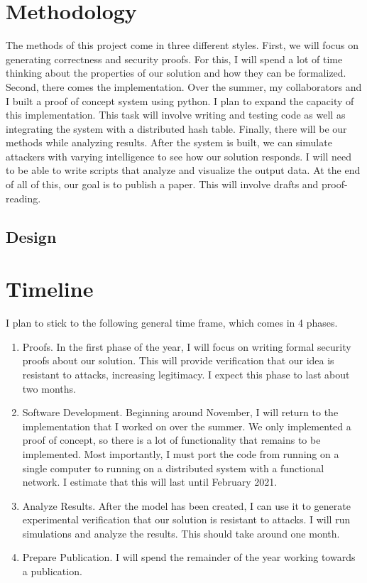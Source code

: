 \section{Methodology}
\label{sec:methodology}


The methods of this project come in three different styles.
First, we will focus on generating correctness and security proofs.
For this, I will spend a lot of time thinking about the properties of our solution and how they can be formalized.
Second, there comes the implementation.
Over the summer, my collaborators and I built a proof of concept system using python.
I plan to expand the capacity of this implementation.
This task will involve writing and testing code as well as integrating the system with a distributed hash table.
Finally, there will be our methods while analyzing results.
After the system is built, we can simulate attackers with varying intelligence to see how our solution responds.
I will need to be able to write scripts that analyze and visualize the output data.
At the end of all of this, our goal is to publish a paper.
This will involve drafts and proof-reading.

\subsection{Design}


\section{Timeline}

I plan to stick to the following general time frame, which comes in 4 phases.
\begin{enumerate}
    \item Proofs.
    In the first phase of the year, I will focus on writing formal security proofs about our solution.
    This will provide verification that our idea is resistant to attacks, increasing legitimacy.
    I expect this phase to last about two months.
    \item Software Development.
    Beginning around November, I will return to the implementation that I worked on over the summer.
    We only implemented a proof of concept, so there is a lot of functionality that remains to be implemented.
    Most importantly, I must port the code from running on a single computer to running on a distributed system with a functional network.
    I estimate that this will last until February 2021.
    \item Analyze Results.
    After the model has been created, I can use it to generate experimental verification that our solution is resistant to attacks.
    I will run simulations and analyze the results.
    This should take around one month.
    \item Prepare Publication.
    I will spend the remainder of the year working towards a publication.
\end{enumerate}
